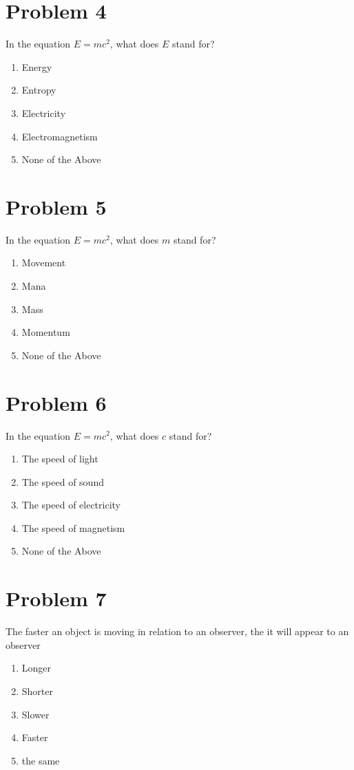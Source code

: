 \documentclass{article}
\begin{document}
\section*{Problem 4}
In the equation $E = mc^2$, what does $E$ stand for?
\begin{enumerate}
    \item Energy
    \item Entropy
    \item Electricity
    \item Electromagnetism
    \item None of the Above
\end{enumerate}
\section*{Problem 5}
In the equation $E = mc^2$, what does $m$ stand for?
\begin{enumerate}
    \item Movement
    \item Mana
    \item Mass
    \item Momentum
    \item None of the Above
\end{enumerate}
\section*{Problem 6}
In the equation $E = mc^2$, what does $c$ stand for?
\begin{enumerate}
    \item The speed of light
    \item The speed of sound
    \item The speed of electricity
    \item The speed of magnetism
    \item None of the Above
\end{enumerate}
\section*{Problem 7}
The faster an object is moving in relation to an observer, the \underline{\hspace{3cm}} it will appear to an observer
\begin{enumerate}
    \item Longer 
    \item Shorter
    \item Slower 
    \item Faster 
    \item the same 
\end{enumerate}
\end{document}
